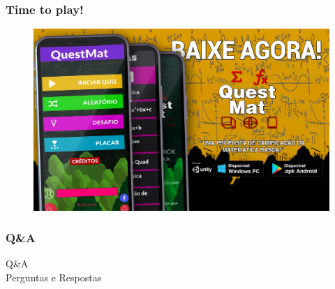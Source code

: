 \documentclass[10pt]{beamer}
\begin{document}

\begin{frame}
\frametitle{Time to play!}

\begin{figure}
	\includegraphics[width=\linewidth, height=0.70\textheight]{QUESTMAT_MOCKUP.jpg}
	\caption{\color{white}{Banner proposto para impressão: Baixe agora! (faltando QR codes )}}
\end{figure}

\end{frame}


\begin{frame}
	\frametitle{Q\&A}
	
	
\begin{center}
{\Huge 	Q\&A \\
	
	\vspace{5mm}
		Perguntas e Respostas}
\end{center}
	
\end{frame}
\end{document}

